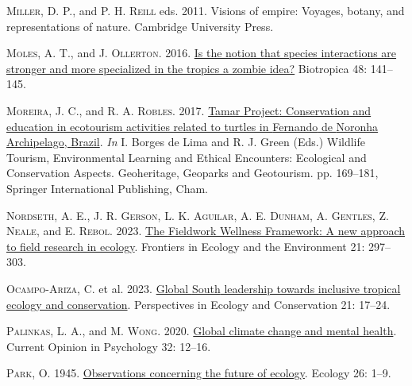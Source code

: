 \documentclass[
  12pt,
  man, donotrepeattitle,floatsintext]{apa6}
\newlength{\cslhangindent}
\newlength{\cslentryspacingunit} %
\newenvironment{CSLReferences}[2] %
 {%
  \setlength{\parindent}{0pt}
  \ifodd #1
  \let\oldpar\par
  \def\par{\hangindent=\cslhangindent\oldpar}
  \fi
  \setlength{\parskip}{#2\cslentryspacingunit}
 }%
 {}
\begin{document}
\begin{CSLReferences}{1}{0}
\leavevmode{}%
\textsc{Miller, D. P.}, and \textsc{P. H. Reill} eds. 2011. Visions of empire: Voyages, botany, and representations of nature. Cambridge University Press.

\leavevmode{}%
\textsc{Moles, A. T.}, and \textsc{J. Ollerton}. 2016. \href{https://doi.org/10.1111/btp.12281}{Is the notion that species interactions are stronger and more specialized in the tropics a zombie idea?} Biotropica 48: 141--145.

\leavevmode{}%
\textsc{Moreira, J. C.}, and \textsc{R. A. Robles}. 2017. \href{https://doi.org/10.1007/978-3-319-55574-4_10}{Tamar {Project}: Conservation and education in ecotourism activities related to turtles in {Fernando} de {Noronha Archipelago}, {Brazil}}. \emph{In} I. Borges de Lima and R. J. Green (Eds.) Wildlife {Tourism}, {Environmental Learning} and {Ethical Encounters}: {Ecological} and {Conservation Aspects}. Geoheritage, {Geoparks} and {Geotourism}. pp. 169--181, Springer International Publishing, Cham.

\leavevmode{}%
\textsc{Nordseth, A. E.}, \textsc{J. R. Gerson}, \textsc{L. K. Aguilar}, \textsc{A. E. Dunham}, \textsc{A. Gentles}, \textsc{Z. Neale}, and \textsc{E. Rebol}. 2023. \href{https://doi.org/10.1002/fee.2649}{The {Fieldwork Wellness Framework}: A new approach to field research in ecology}. Frontiers in Ecology and the Environment 21: 297--303.

\leavevmode{}%
\textsc{Ocampo-Ariza, C.} et al. 2023. \href{https://doi.org/10.1016/j.pecon.2023.01.002}{Global {South} leadership towards inclusive tropical ecology and conservation}. Perspectives in Ecology and Conservation 21: 17--24.

\leavevmode{}%
\textsc{Palinkas, L. A.}, and \textsc{M. Wong}. 2020. \href{https://doi.org/10.1016/j.copsyc.2019.06.023}{Global climate change and mental health}. Current Opinion in Psychology 32: 12--16.

\leavevmode{}%
\textsc{Park, O.} 1945. \href{https://doi.org/10.2307/1931910}{Observations concerning the future of ecology}. Ecology 26: 1--9.


\end{CSLReferences}
\end{document}
